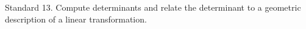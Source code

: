 Standard 13.	Compute determinants and relate the determinant to a geometric description of a linear transformation. 

\ifprintanswers
\else %
 \newpage
\fi

\begin{solution}
   
\end{solution}